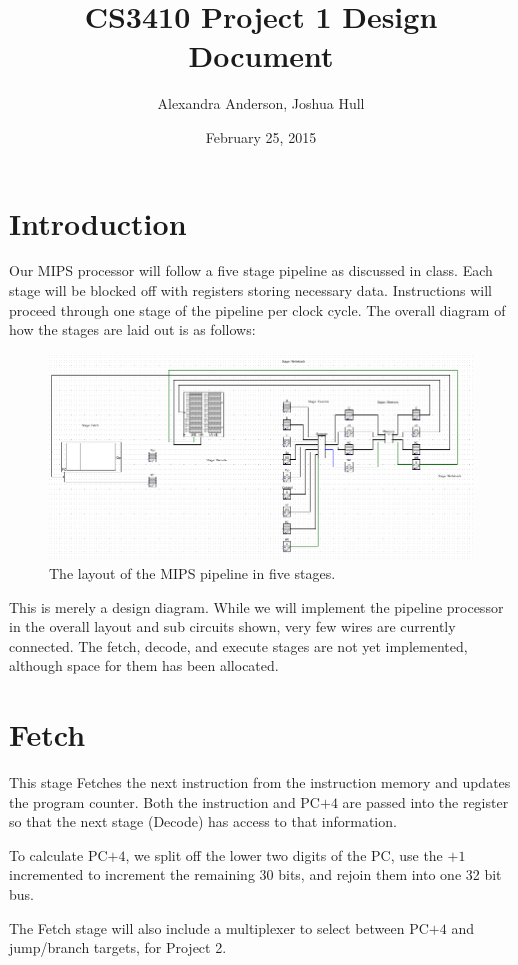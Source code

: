 \documentclass{article}
\title{CS3410 Project 1 Design Document}
\date{February 25, 2015}
\author{Alexandra Anderson, Joshua Hull}
\begin{document}
\maketitle

\section*{Introduction}
Our MIPS processor will follow a five stage pipeline as discussed in class.  Each stage will be blocked off with registers storing necessary data.  Instructions will proceed through one stage of the pipeline per clock cycle. The overall diagram of how the stages are laid out is as follows:

\begin{figure}[h]
	\includegraphics[width = \textwidth]{layout}
	\caption{The layout of the MIPS pipeline in five stages.}
\end{figure}

This is merely a design diagram. While we will implement the pipeline processor in the overall layout and sub circuits shown, very few wires are currently connected. The fetch, decode, and execute stages are not yet implemented, although space for them has been allocated. 

\section*{Fetch}
This stage Fetches the next instruction from the instruction memory and updates the program counter.  Both the instruction and PC$+4$ are passed into the register so that the next stage (Decode) has access to that information.  

To calculate PC$+4$, we split off the lower two digits of the PC, use the $+1$ incremented to increment the remaining 30 bits, and rejoin them into one 32 bit bus. 

The Fetch stage will also include a multiplexer to select between PC$+4$ and jump/branch targets, for Project 2. 
\end{document}
